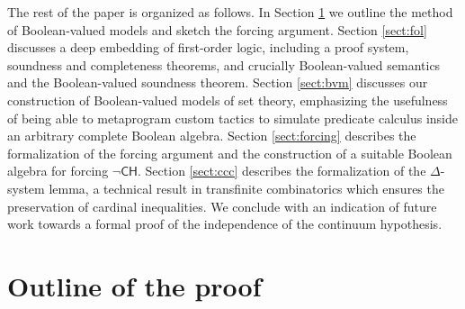 \documentclass[a4paper,USenglish,cleveref, autoref]{lipics-v2019}
\begin{document}
The rest of the paper is organized as follows. In Section \ref{sect:outline} we outline the method of Boolean-valued models and sketch the forcing argument. Section \ref{sect:fol} discusses a deep embedding of first-order logic, including a proof system, soundness and completeness theorems, and crucially Boolean-valued semantics and the Boolean-valued soundness theorem. Section \ref{sect:bvm} discusses our construction of Boolean-valued models of set theory, emphasizing the usefulness of being able to metaprogram custom tactics to simulate predicate calculus inside an arbitrary complete Boolean algebra. Section \ref{sect:forcing} describes the formalization of the forcing argument and the construction of a suitable Boolean algebra for forcing $\neg\mathsf{CH}$. Section \ref{sect:ccc} describes the formalization of the $\Delta$-system lemma, a technical result in transfinite combinatorics which ensures the preservation of cardinal inequalities. We conclude with an indication of future work towards a formal proof of the independence of the continuum hypothesis.
\section{Outline of the proof}
\label{sect:outline}

\end{document}
